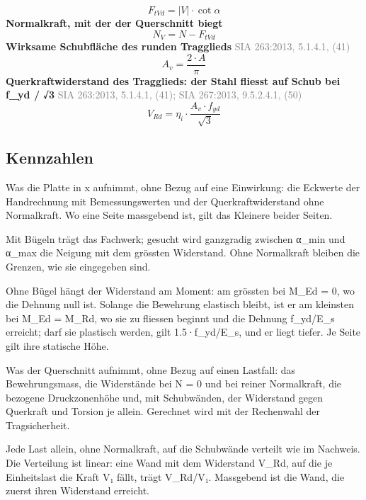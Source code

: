 \documentclass[11pt,a4paper]{article}
\newcommand{\normref}[1]{{\small\textcolor{gray}{#1}}}
\begin{document}
\begin{equation*}
F_{tVd} = \left|V\right| \cdot \cot \alpha
\end{equation*}
\noindent\textbf{Normalkraft, mit der der Querschnitt biegt}
\begin{equation*}
N_V = N - F_{tVd}
\end{equation*}
\noindent\textbf{Wirksame Schubfläche des runden Tragglieds} \hfill \normref{SIA 263:2013, 5.1.4.1, (41)}
\begin{equation*}
A_v = \frac{2 \cdot A}{\pi}
\end{equation*}
\noindent\textbf{Querkraftwiderstand des Tragglieds: der Stahl fliesst auf Schub bei f\_yd / √3} \hfill \normref{SIA 263:2013, 5.1.4.1, (41); SIA 267:2013, 9.5.2.4.1, (50)}
\begin{equation*}
V_{Rd} = \eta_i \cdot \frac{A_v \cdot f_{yd}}{\sqrt{3}}
\end{equation*}
\subsection{Kennzahlen}
Was die Platte in x aufnimmt, ohne Bezug auf eine Einwirkung: die Eckwerte der Handrechnung mit Bemessungswerten und der Querkraftwiderstand ohne Normalkraft. Wo eine Seite massgebend ist, gilt das Kleinere beider Seiten.

Mit Bügeln trägt das Fachwerk; gesucht wird ganzgradig zwischen α\_min und α\_max die Neigung mit dem grössten Widerstand. Ohne Normalkraft bleiben die Grenzen, wie sie eingegeben sind.

Ohne Bügel hängt der Widerstand am Moment: am grössten bei M\_Ed = 0, wo die Dehnung null ist. Solange die Bewehrung elastisch bleibt, ist er am kleinsten bei M\_Ed = M\_Rd, wo sie zu fliessen beginnt und die Dehnung f\_yd/E\_s erreicht; darf sie plastisch werden, gilt 1.5·f\_yd/E\_s, und er liegt tiefer. Je Seite gilt ihre statische Höhe.

Was der Querschnitt aufnimmt, ohne Bezug auf einen Lastfall: das Bewehrungsmass, die Widerstände bei N = 0 und bei reiner Normalkraft, die bezogene Druckzonenhöhe und, mit Schubwänden, der Widerstand gegen Querkraft und Torsion je allein. Gerechnet wird mit der Rechenwahl der Tragsicherheit.

Jede Last allein, ohne Normalkraft, auf die Schubwände verteilt wie im Nachweis. Die Verteilung ist linear: eine Wand mit dem Widerstand V\_Rd, auf die je Einheitslast die Kraft V₁ fällt, trägt V\_Rd/V₁. Massgebend ist die Wand, die zuerst ihren Widerstand erreicht.
\end{document}
